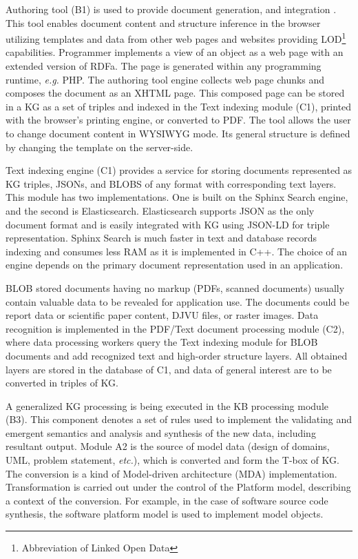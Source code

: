 \documentclass[
]{ceurart}
\begin{document}
Authoring tool (B1) is used to provide document generation, and integration \cite{zont19}.  This tool enables document content and structure inference in the browser utilizing templates and data from other web pages and websites providing LOD\footnote{Abbreviation of Linked Open Data} \cite{lod} capabilities.  Programmer implements a view of an object as a web page with an extended version of RDFa.  The page is generated within any programming runtime, \emph{e.g.} PHP.  The authoring tool engine collects web page chunks and composes the document as an XHTML page.  This composed page can be stored in a KG as a set of triples and indexed in the Text indexing module (C1), printed with the browser's printing engine, or converted to PDF.  The tool allows the user to change document content in WYSIWYG mode.  Its general structure is defined by changing the template on the server-side.

Text indexing engine (C1) provides a service for storing documents represented as KG triples, JSONs, and BLOBS of any format with corresponding text layers.  This module has two implementations.  One is built on the Sphinx Search engine, and the second is Elasticsearch.  Elasticsearch supports JSON as the only document format and is easily integrated with KG using JSON-LD for triple representation.  Sphinx Search is much faster in text and database records indexing and consumes less RAM as it is implemented in C++.  The choice of an engine depends on the primary document representation used in an application.

BLOB stored documents having no markup (PDFs, scanned documents) usually contain valuable data to be revealed for application use.  The documents could be report data or scientific paper content, DJVU files, or raster images.  Data recognition is implemented in the PDF/Text document processing module (C2), where data processing workers query the Text indexing module for BLOB documents and add recognized text and high-order structure layers.  All obtained layers are stored in the database of C1, and data of general interest are to be converted in triples of KG.

A generalized KG processing is being executed in the KB processing module (B3).  This component denotes a set of rules used to implement the validating and emergent semantics and analysis and synthesis of the new data, including resultant output.  Module A2 is the source of model data (design of domains, UML, problem statement, \emph{etc.}), which is converted and form the T-box of KG.  The conversion is a kind of Model-driven architecture (MDA) implementation.  Transformation is carried out under the control of the Platform model, describing a context of the conversion.  For example, in the case of software source code synthesis, the software platform model is used to implement model objects.
\end{document}
